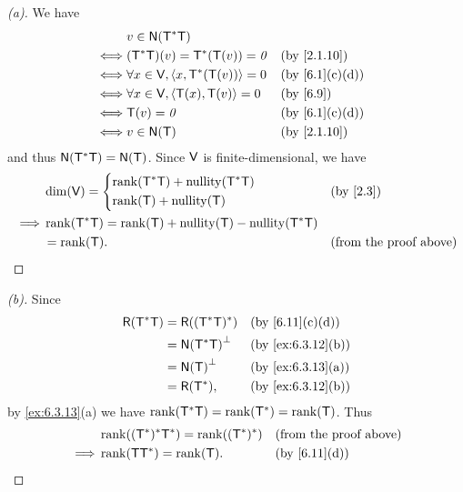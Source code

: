 \begin{proof}[(a)]
  We have
  \begin{align*}
         & v \in \ns{\T^* \T}                                            \\
    \iff & (\T^* \T)(v) = \T^*(\T(v)) = \zv           &  & \by{2.1.10}   \\
    \iff & \forall x \in \V, \inn{x, \T^*(\T(v))} = 0 &  & \by{6.1}[c,d] \\
    \iff & \forall x \in \V, \inn{\T(x), \T(v)} = 0   &  & \by{6.9}      \\
    \iff & \T(v) = \zv                                &  & \by{6.1}[c,d] \\
    \iff & v \in \ns{\T}                              &  & \by{2.1.10}
  \end{align*}
  and thus \(\ns{\T^* \T} = \ns{\T}\).
  Since \(\mathsf{V}\) is finite-dimensional, we have
  \begin{align*}
             & \dim(\V) = \begin{dcases}
                            \rk{\T^* \T} + \nt{\T^* \T} \\
                            \rk{\T} + \nt{\T}
                          \end{dcases}                  &  & \by{2.3}                             \\
    \implies & \rk{\T^* \T} = \rk{\T} + \nt{\T} - \nt{\T^* \T}                                    \\
             & = \rk{\T}.                                      &  & \text{(from the proof above)}
  \end{align*}
\end{proof}

\begin{proof}[(b)]
  Since
  \begin{align*}
    \rg{\T^* \T} & = \rg{(\T^* \T)^*}     &  & \by{6.11}[c,d]    \\
                 & = \ns{\T^* \T}^{\perp} &  & \by{ex:6.3.12}[b] \\
                 & = \ns{\T}^{\perp}      &  & \by{ex:6.3.13}[a] \\
                 & = \rg{\T^*},           &  & \by{ex:6.3.12}[b]
  \end{align*}
  by \cref{ex:6.3.13}(a) we have \(\rk{\T^* \T} = \rk{\T^*} = \rk{\T}\).
  Thus
  \begin{align*}
             & \rk{(\T^*)^* \T^*} = \rk{(\T^*)^*} &  & \text{(from the proof above)} \\
    \implies & \rk{\T \T^*} = \rk{\T}.            &  & \by{6.11}[d]
  \end{align*}
\end{proof}

